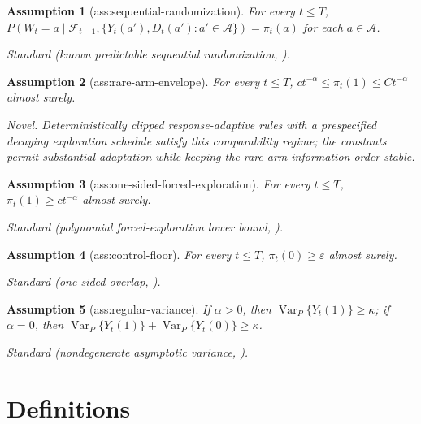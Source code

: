 \documentclass{article}
\newtheorem{assumption}{Assumption}
\begin{document}
\begin{assumption}[ass:sequential-randomization]\label{ass:sequential-randomization}
For every \(t\leq T\), \(P(W_t=a\mid\mathcal F_{t-1},\{Y_t(a'),D_t(a'):a'\in\mathcal A\})=\pi_t(a)\) for each \(a\in\mathcal A\).
\par\smallskip\noindent\emph{Standard} (known predictable sequential randomization, \cite{HadadHirshbergZhanWagerAthey2021}).
\end{assumption}

\begin{assumption}[ass:rare-arm-envelope]\label{ass:rare-arm-envelope}
For every \(t\leq T\), \(ct^{-\alpha}\leq\pi_t(1)\leq Ct^{-\alpha}\) almost surely.
\par\smallskip\noindent\emph{Novel.} Deterministically clipped response-adaptive rules with a prespecified decaying exploration schedule satisfy this comparability regime; the constants permit substantial adaptation while keeping the rare-arm information order stable.
\end{assumption}

\begin{assumption}[ass:one-sided-forced-exploration]\label{ass:one-sided-forced-exploration}
For every \(t\leq T\), \(\pi_t(1)\geq ct^{-\alpha}\) almost surely.
\par\smallskip\noindent\emph{Standard} (polynomial forced-exploration lower bound, \cite{ShiWangWu2023DelayedInference}).
\end{assumption}

\begin{assumption}[ass:control-floor]\label{ass:control-floor}
For every \(t\leq T\), \(\pi_t(0)\geq\varepsilon\) almost surely.
\par\smallskip\noindent\emph{Standard} (one-sided overlap, \cite{HadadHirshbergZhanWagerAthey2021}).
\end{assumption}

\begin{assumption}[ass:regular-variance]\label{ass:regular-variance}
If \(\alpha>0\), then \(\operatorname{Var}_P\{Y_t(1)\}\geq\kappa\); if \(\alpha=0\), then \(\operatorname{Var}_P\{Y_t(1)\}+\operatorname{Var}_P\{Y_t(0)\}\geq\kappa\).
\par\smallskip\noindent\emph{Standard} (nondegenerate asymptotic variance, \cite{HadadHirshbergZhanWagerAthey2021}).
\end{assumption}

\section{Definitions}
\end{document}
